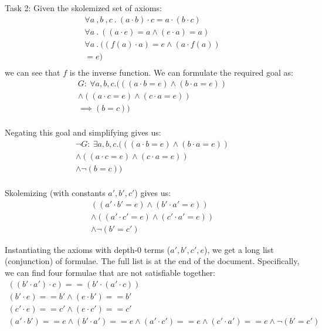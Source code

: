 \documentclass[12pt,letterpaper, onecolumn]{exam}
\begin{document}
\begin{questions}
	Task 2:
	Given the skolemized set of axioms:
	\begin{align*}
		\forall a \:, b \:, c \:.\: (a \cdot b) \cdot c = a \cdot (b \cdot c) \\
		\forall a \:.\: ((a \cdot e) = a \land (e \cdot a) = a) \\
		\forall a \:.\: ((f(a)\cdot a) = e \land (a \cdot f(a))  \\ = e) \\
	\end{align*}
	we can see that $f$ is the inverse function. 
	We can formulate the required goal as:
	\begin{align*}
		G : \: \forall a, b, c . (((a \cdot b = e) \land (b \cdot a = e))  \\ \land (
			(a \cdot c = e) \land (c \cdot a = e))  \\ \implies (b = c))  \\
	\end{align*}

	Negating this goal and simplifying gives us:
	\begin{align*}
		\neg G : \: \exists a, b, c . (((a \cdot b = e) \land (b \cdot a = e))  \\ \land (
			(a \cdot c = e) \land (c \cdot a = e))  \\ \land \neg(b = c))  \\
	\end{align*}

	Skolemizing (with constants $a', b', c'$) gives us:
	\begin{align*}
		((a' \cdot b' = e) \land (b' \cdot a' = e))  \\ \land (
			(a' \cdot c' = e) \land (c' \cdot a' = e))  \\ \land \neg(b' = c')
	\end{align*}

	Instantiating the axioms with depth-0 terms ($a', b', c', e$), we get a long list (conjunction) of formulae. The full list is at the end of the document.
	Specifically, we can find four formulae that are not satisfiable together:
	\begin{align*}
		((b' \cdot a') \cdot c) == (b' \cdot (a' \cdot c))  \\
		(b' \cdot e) == b' \land (e \cdot b') == b' \\
		(c' \cdot e) == c' \land (e \cdot c') == c' \\
		(a' \cdot b') == e \land (b' \cdot a') == e \land (a' \cdot c') == e \land (c' \cdot a') == e \land \neg(b' = c')
	\end{align*}


\end{questions}
\end{document}
